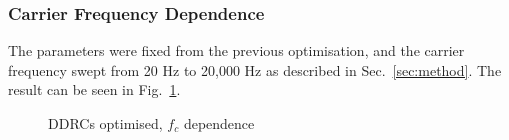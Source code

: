 \documentclass[../main2.tex]{subfiles}
\providecommand{\rootdir}{..}
\begin{document}
\subsubsection{Carrier Frequency Dependence}
The parameters were fixed from the previous optimisation, and the carrier frequency swept from 20 Hz to 20,000 Hz as described in Sec.~\ref{sec:method}. The result can be seen in Fig.~\ref{fig:complete_DDRC_opt_fc_dep}.

\begin{figure}[h]
\centerline{}
\caption{DDRCs optimised, $f_c$ dependence}
\label{fig:complete_DDRC_opt_fc_dep}
\end{figure}
\end{document}
